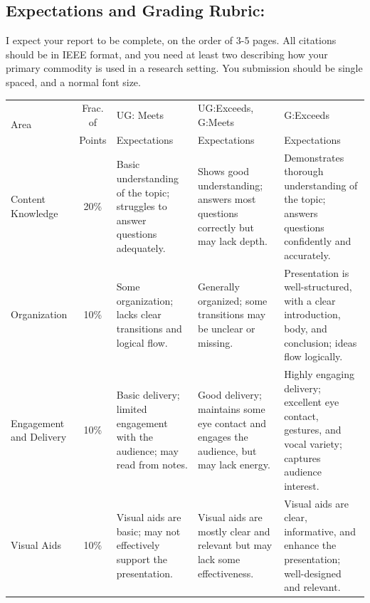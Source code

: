 \documentclass[11pt]{article}
\begin{document}
\subsection*{Expectations and Grading Rubric:}
I expect your report to be complete, on the order of 3-5 pages. All citations should be in IEEE format, and you need at least two describing how your primary commodity is used in a research setting. You submission should be single spaced, and a normal font size.

\begin{landscape}
\begin{table}
    \centering
    \small
    \begin{tabular}{p{.75in} c  p{2.25in}  p{2.25in}  p{2.25in}}
        \multirow{2}{*}{Area}  	& Frac. of   	& UG: Meets		& UG:Exceeds, G:Meets   & G:Exceeds 	  \\
                                & Points        & Expectations  & Expectations  		& Expectations \\
        \toprule
        Content Knowledge       & 20\%\vspace{.25in} 			& Basic understanding of the topic; struggles to answer questions adequately. & Shows good understanding; answers most questions correctly but may lack depth. & Demonstrates thorough understanding of the topic; answers questions confidently and accurately. \\
        \midrule
        Organization                 & 10\%\vspace{.25in}		& Some organization; lacks clear transitions and logical flow. & Generally organized; some transitions may be unclear or missing. & Presentation is well-structured, with a clear introduction, body, and conclusion; ideas flow logically. \\
        \midrule
        Engagement and Delivery & 10\%\vspace{.25in}			& Basic delivery; limited engagement with the audience; may read from notes. & Good delivery; maintains some eye contact and engages the audience, but may lack energy. & Highly engaging delivery; excellent eye contact, gestures, and vocal variety; captures audience interest. \\
        \midrule
        Visual Aids             & 10\%\vspace{.25in}			& Visual aids are basic; may not effectively support the presentation. & Visual aids are mostly clear and relevant but may lack some effectiveness. & Visual aids are clear, informative, and enhance the presentation; well-designed and relevant. \\

\end{tabular}
\end{table}
\end{landscape}
\end{document}
